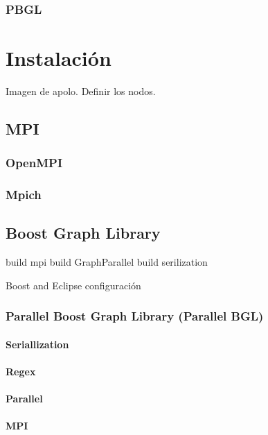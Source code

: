 \documentclass[twoside,letterpaper,12pt]{report}
\begin{document}
\subsection{PBGL}


\chapter{Instalación}



Imagen de apolo.
Definir los nodos.

\section{MPI}

\subsection{OpenMPI}
\subsection{Mpich}

\section{Boost Graph Library}

	build mpi
	build GraphParallel
	build serilization

Boost and Eclipse
	configuración
	
\subsection{Parallel Boost Graph Library (Parallel BGL) }
\subsubsection{Seriallization}
\subsubsection{Regex}
\subsubsection{Parallel}
\subsubsection{MPI}
\end{document}
